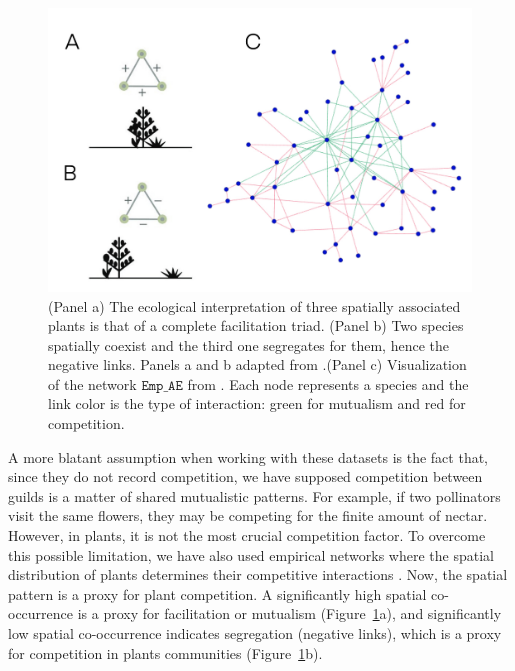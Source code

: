 \begin{figure}[h!]
     \centering
\includegraphics[width=\columnwidth]{figures/methods/fig_hugofacitilation.pdf}
 \caption[Spatial co-occurrence networks]{(Panel a) The ecological interpretation of three spatially associated plants is that of a complete facilitation triad. (Panel b) Two species spatially coexist and the third one segregates for them, hence the negative links. Panels a and b adapted from \cite{Saiz2017EvidenceNetworks}.(Panel c) Visualization of the network $\texttt{Emp}\_\texttt{AE}$ from \cite{Saiz2017EvidenceNetworks}. Each node represents a species and the link color is the type of interaction: green for mutualism and red for competition.}
\label{chp:methods:fig:hugo}
\end{figure}

A more blatant assumption when working with these datasets is the fact that, since they do not record competition, we have supposed competition between guilds is a matter of shared mutualistic patterns. For example, if two pollinators visit the same flowers, they may be competing for the finite amount of nectar. However, in plants, it is not the most crucial competition factor. To overcome this possible limitation, we have also used empirical networks where the spatial distribution of plants determines their competitive interactions \cite{Saiz2017EvidenceNetworks}. Now, the spatial pattern is a proxy for plant competition. A significantly high spatial co-occurrence is a proxy for facilitation or mutualism (Figure~\ref{chp:methods:fig:hugo}a), and significantly low spatial co-occurrence indicates segregation (negative links), which is a proxy for competition in plants communities (Figure~\ref{chp:methods:fig:hugo}b).\\

